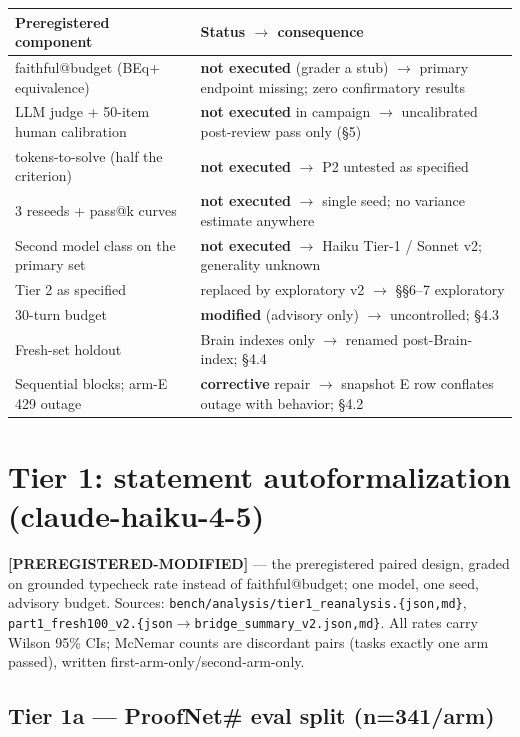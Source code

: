 \documentclass[10pt]{article}
\newcommand{\code}[1]{\texttt{#1}}
\begin{document}
\begin{center}
\footnotesize
\begin{tabular}{@{}p{}p{}@{}}
\toprule
Preregistered component & Status $\to$ consequence \\
\midrule
faithful@budget (BEq+ equivalence) & \textbf{not executed} (grader a stub) $\to$ primary endpoint missing; zero confirmatory results \\
LLM judge + 50-item human calibration & \textbf{not executed} in campaign $\to$ uncalibrated post-review pass only (\S5) \\
tokens-to-solve (half the criterion) & \textbf{not executed} $\to$ P2 untested as specified \\
3 reseeds + pass@k curves & \textbf{not executed} $\to$ single seed; no variance estimate anywhere \\
Second model class on the primary set & \textbf{not executed} $\to$ Haiku Tier-1 / Sonnet v2; generality unknown \\
Tier 2 as specified & replaced by exploratory v2 $\to$ \S\S6--7 exploratory \\
30-turn budget & \textbf{modified} (advisory only) $\to$ uncontrolled; \S4.3 \\
Fresh-set holdout & Brain indexes only $\to$ renamed post-Brain-index; \S4.4 \\
Sequential blocks; arm-E 429 outage & \textbf{corrective} repair $\to$ snapshot E row conflates outage with behavior; \S4.2 \\
\bottomrule
\end{tabular}
\end{center}

\section{Tier 1: statement autoformalization (claude-haiku-4-5)}\label{sec:tier1}

{\sloppy
\textbf{[PREREGISTERED-MODIFIED]} --- the preregistered paired design,
graded on grounded typecheck rate instead of faithful@budget; one model,
one seed, advisory budget. Sources:
\code{bench/analysis/tier1\_reanalysis.\{json,md\}},
\code{part1\_fresh100\_v2.\{json$\to$bridge\_summary\_v2.json,md\}}. All
rates carry Wilson 95\% CIs; McNemar counts are discordant pairs (tasks
exactly one arm passed), written first-arm-only/second-arm-only.\par}

\subsection{Tier 1a --- ProofNet\# eval split (n=341/arm)}\label{sec:tier1a}
\end{document}
